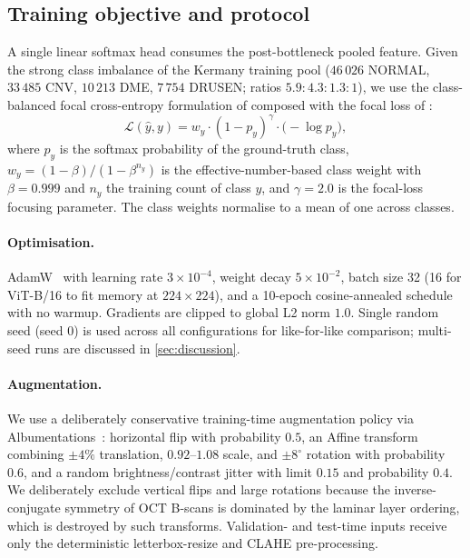 \documentclass[5p]{elsarticle}
\begin{document}
\subsection{Training objective and protocol}
\label{sec:train-protocol}
A single linear softmax head consumes the post-bottleneck pooled feature. Given the strong class imbalance of the Kermany training pool ($46\,026$ NORMAL, $33\,485$ CNV, $10\,213$ DME, $7\,754$ DRUSEN; ratios $5.9{:}4.3{:}1.3{:}1$), we use the class-balanced focal cross-entropy formulation of \citet{cui2019} composed with the focal loss of \citet{lin2017focal}:
\begin{equation}
    \mathcal{L}(\hat{y}, y) = w_y \cdot (1 - p_y)^\gamma \cdot \big(-\log p_y\big),
\end{equation}
where $p_y$ is the softmax probability of the ground-truth class, $w_y = (1 - \beta) / (1 - \beta^{n_y})$ is the effective-number-based class weight with $\beta = 0.999$ and $n_y$ the training count of class $y$, and $\gamma = 2.0$ is the focal-loss focusing parameter. The class weights normalise to a mean of one across classes.

\paragraph{Optimisation.}
AdamW~\citep{loshchilov2019decoupled} with learning rate $3 \times 10^{-4}$, weight decay $5 \times 10^{-2}$, batch size 32 (16 for ViT-B/16 to fit memory at $224\times 224$), and a 10-epoch cosine-annealed schedule with no warmup. Gradients are clipped to global L2 norm $1.0$. Single random seed (seed 0) is used across all configurations for like-for-like comparison; multi-seed runs are discussed in \cref{sec:discussion}.

\paragraph{Augmentation.}
We use a deliberately conservative training-time augmentation policy via Albumentations~\citep{buslaev2020albumentations}: horizontal flip with probability $0.5$, an Affine transform combining $\pm 4\%$ translation, $0.92$--$1.08$ scale, and $\pm 8^{\circ}$ rotation with probability $0.6$, and a random brightness/contrast jitter with limit $0.15$ and probability $0.4$. We deliberately exclude vertical flips and large rotations because the inverse-conjugate symmetry of OCT B-scans is dominated by the laminar layer ordering, which is destroyed by such transforms. Validation- and test-time inputs receive only the deterministic letterbox-resize and CLAHE pre-processing.
\end{document}
